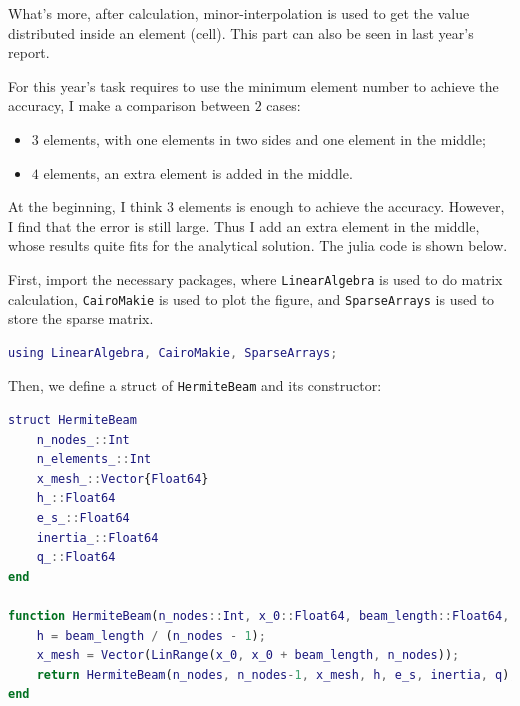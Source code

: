 What's more, 
after calculation, 
minor-interpolation is used to get the value distributed 
inside an element (cell).
This part can also be seen in last year's report.

For this year's task requires to use the 
minimum element number to achieve the accuracy,
I make a comparison between $2$ cases:
\begin{itemize}
    \item $3$ elements, with one elements in two sides and one element in the middle;
    \item $4$ elements, an extra element is added in the middle.
\end{itemize}

At the beginning, 
I think $3$ elements is enough to achieve the accuracy.
However,
I find that the error is still large.
Thus I add an extra element in the middle,
whose results quite fits for the analytical solution.
The julia code is shown below.

First, 
import the necessary packages,
where \verb|LinearAlgebra| is used to do matrix calculation,
\verb|CairoMakie| is used to plot the figure,
and \verb|SparseArrays| is used to store the sparse matrix.
\begin{lstlisting}[language=matlab]
using LinearAlgebra, CairoMakie, SparseArrays;
\end{lstlisting}

Then, we define a struct of \verb|HermiteBeam| and
its constructor:
\begin{lstlisting}[language=matlab]
struct HermiteBeam
    n_nodes_::Int
    n_elements_::Int
    x_mesh_::Vector{Float64}
    h_::Float64
    e_s_::Float64
    inertia_::Float64
    q_::Float64
end

function HermiteBeam(n_nodes::Int, x_0::Float64, beam_length::Float64, e_s::Float64, inertia::Float64, q::Float64)
    h = beam_length / (n_nodes - 1);
    x_mesh = Vector(LinRange(x_0, x_0 + beam_length, n_nodes));
    return HermiteBeam(n_nodes, n_nodes-1, x_mesh, h, e_s, inertia, q);
end
\end{lstlisting}

